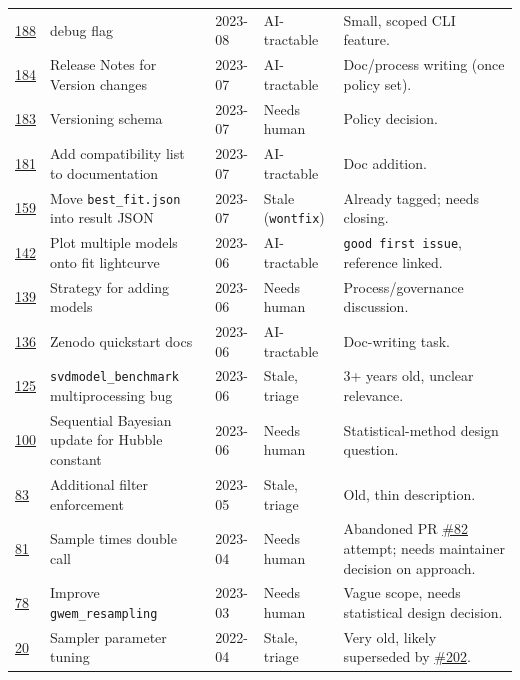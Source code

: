 \documentclass[10pt]{article}
\newcommand{\code}[1]{\texttt{#1}}
\begin{document}
\begin{longtable}{@{}p{0.9cm}p{5.1cm}p{1.2cm}p{2.3cm}p{5.6cm}@{}}
\href{https://github.com/nuclear-multimessenger-astronomy/nmma/issues/188}{188} & debug flag & 2023-08 & AI-tractable & Small, scoped CLI feature. \\[3pt]
\href{https://github.com/nuclear-multimessenger-astronomy/nmma/issues/184}{184} & Release Notes for Version changes & 2023-07 & AI-tractable & Doc/process writing (once policy set). \\[3pt]
\href{https://github.com/nuclear-multimessenger-astronomy/nmma/issues/183}{183} & Versioning schema & 2023-07 & Needs human & Policy decision. \\[3pt]
\href{https://github.com/nuclear-multimessenger-astronomy/nmma/issues/181}{181} & Add compatibility list to documentation & 2023-07 & AI-tractable & Doc addition. \\[3pt]
\href{https://github.com/nuclear-multimessenger-astronomy/nmma/issues/159}{159} & Move \code{best\_fit.json} into result JSON & 2023-07 & Stale (\code{wontfix}) & Already tagged; needs closing. \\[3pt]
\href{https://github.com/nuclear-multimessenger-astronomy/nmma/issues/142}{142} & Plot multiple models onto fit lightcurve & 2023-06 & AI-tractable & \code{good first issue}, reference linked. \\[3pt]
\href{https://github.com/nuclear-multimessenger-astronomy/nmma/issues/139}{139} & Strategy for adding models & 2023-06 & Needs human & Process/governance discussion. \\[3pt]
\href{https://github.com/nuclear-multimessenger-astronomy/nmma/issues/136}{136} & Zenodo quickstart docs & 2023-06 & AI-tractable & Doc-writing task. \\[3pt]
\href{https://github.com/nuclear-multimessenger-astronomy/nmma/issues/125}{125} & \code{svdmodel\_benchmark} multiprocessing bug & 2023-06 & Stale, triage & 3+ years old, unclear relevance. \\[3pt]
\href{https://github.com/nuclear-multimessenger-astronomy/nmma/issues/100}{100} & Sequential Bayesian update for Hubble constant & 2023-06 & Needs human & Statistical-method design question. \\[3pt]
\href{https://github.com/nuclear-multimessenger-astronomy/nmma/issues/83}{83} & Additional filter enforcement & 2023-05 & Stale, triage & Old, thin description. \\[3pt]
\href{https://github.com/nuclear-multimessenger-astronomy/nmma/issues/81}{81} & Sample times double call & 2023-04 & Needs human & Abandoned PR \href{https://github.com/nuclear-multimessenger-astronomy/nmma/issues/82}{\#82} attempt; needs maintainer decision on approach. \\[3pt]
\href{https://github.com/nuclear-multimessenger-astronomy/nmma/issues/78}{78} & Improve \code{gwem\_resampling} & 2023-03 & Needs human & Vague scope, needs statistical design decision. \\[3pt]
\href{https://github.com/nuclear-multimessenger-astronomy/nmma/issues/20}{20} & Sampler parameter tuning & 2022-04 & Stale, triage & Very old, likely superseded by \href{https://github.com/nuclear-multimessenger-astronomy/nmma/issues/202}{\#202}. \\
\bottomrule
\end{longtable}
\end{document}
